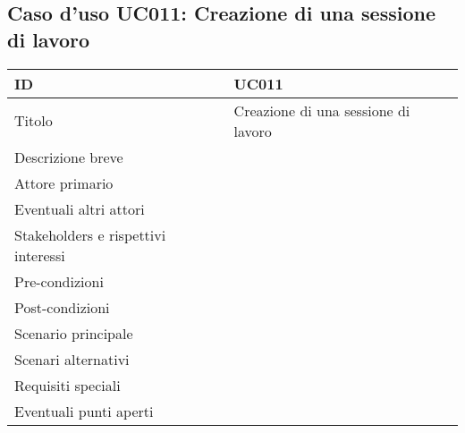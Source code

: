 \documentclass[../../main.tex]{subfiles}
\begin{document}
\subsection{Caso d’uso UC011: Creazione di una sessione di lavoro }
\begin{tabularx}{150mm}{|l|X|}
    \hline
    ID                                  & \textbf{UC011}\\
    \hline
    Titolo                              & Creazione di una sessione di lavoro \\
    \hline
    Descrizione breve                   &    \\
    \hline
    Attore primario                     &    \\
    \hline
    Eventuali altri attori              &    \\
    \hline
    Stakeholders e rispettivi interessi &    \\
    \hline
    Pre-condizioni                      &    \\
    \hline
    Post-condizioni                     &    \\
    \hline
    Scenario principale                 &    \\
    \hline
    Scenari alternativi                 &    \\
    \hline
    Requisiti speciali                  &    \\
    \hline
    Eventuali punti aperti              &    \\
    \hline
\end{tabularx}
\newpage
\end{document}
